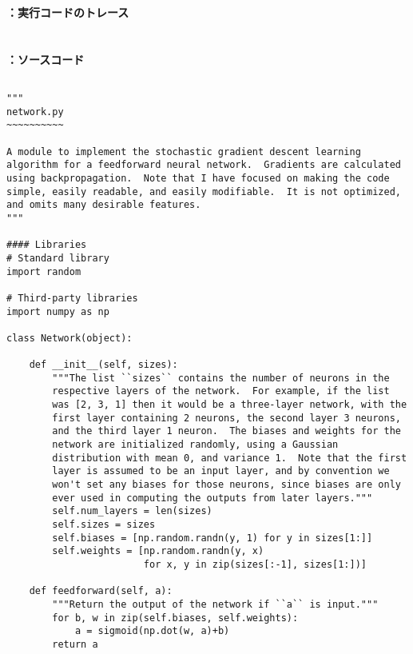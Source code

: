 \documentclass[11pt,a4j,fleqn]{jarticle}
\newcounter{apart}
\begin{document}
\textbf{\Large \theapart ：実行コードのトレース}　\\
\\
\\
\textbf{\Large \theapart ：ソースコード}
\begin{verbatim}

"""
network.py
~~~~~~~~~~

A module to implement the stochastic gradient descent learning
algorithm for a feedforward neural network.  Gradients are calculated
using backpropagation.  Note that I have focused on making the code
simple, easily readable, and easily modifiable.  It is not optimized,
and omits many desirable features.
"""

#### Libraries
# Standard library
import random

# Third-party libraries
import numpy as np

class Network(object):

    def __init__(self, sizes):
        """The list ``sizes`` contains the number of neurons in the
        respective layers of the network.  For example, if the list
        was [2, 3, 1] then it would be a three-layer network, with the
        first layer containing 2 neurons, the second layer 3 neurons,
        and the third layer 1 neuron.  The biases and weights for the
        network are initialized randomly, using a Gaussian
        distribution with mean 0, and variance 1.  Note that the first
        layer is assumed to be an input layer, and by convention we
        won't set any biases for those neurons, since biases are only
        ever used in computing the outputs from later layers."""
        self.num_layers = len(sizes)
        self.sizes = sizes
        self.biases = [np.random.randn(y, 1) for y in sizes[1:]]
        self.weights = [np.random.randn(y, x)
                        for x, y in zip(sizes[:-1], sizes[1:])]

    def feedforward(self, a):
        """Return the output of the network if ``a`` is input."""
        for b, w in zip(self.biases, self.weights):
            a = sigmoid(np.dot(w, a)+b)
        return a


\end{verbatim}
\end{document}
